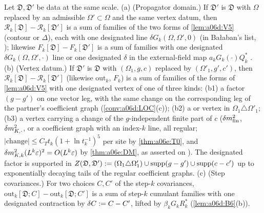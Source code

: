 \begin{lemma}\label{lem:a06d:V7}
Let $\mathfrak D,\mathfrak D'$ be data at the same scale. \textup{(a)} (Propagator domain.) If $\mathfrak D'$ is $\mathfrak D$ with $\Omega$ replaced by an admissible $\Omega'\subset\Omega$ and the same vertex datum, then $\mathcal R_k[\mathfrak D]-\mathcal R_k[\mathfrak D']$ is a sum of families of the two forms of \cref{lem:a06d:V5} (contour or $\Delta$), each with one designated line $\delta G_k(\Omega,\Omega',0)$ (in Ba{\l}aban's list, \cite[p.~414]{Ba3}); likewise $F_k[\mathfrak D]-F_k[\mathfrak D']$ is a sum of families with one designated $\delta G_k(\Omega,\Omega',\cdot)$ line or one designated $\delta$ in the external-field map $a_kG_k(\cdot)Q_k^*$ \cite[p.~415]{Ba3}. \textup{(b)} (Vertex datum.) If $\mathfrak D'$ is $\mathfrak D$ with $(\Omega_1,g,c)$ replaced by $(\Omega'_1,g',c')$, then $\mathcal R_k[\mathfrak D]-\mathcal R_k[\mathfrak D']$ (likewise $\mathrm{out}_k$, $F_k$) is a sum of families of the forms of \cref{lem:a06d:V5} with one designated vertex of one of three kinds: (b1) a factor $(g-g')$ on one vector leg, with the same change on the corresponding leg of the \cite[(1.7)]{Ba3} partner's coefficient graph (\cref{conv:a06d:LOC}(c)); (b2) a \cite[(1.6)]{Ba3} or \cite[(1.7)]{Ba3} vertex in $\Omega_1\triangle\Omega'_1$; (b3) a \cite[(1.7)]{Ba3} vertex carrying a change of the $g$-independent finite part of $c$ ($\delta m^2_{\mathrm{fin}}$, $\delta m^2_{K,\cdot}$, or a coefficient graph with an index-$k$ line, all regular; $|\text{change}|\le C_Tt_k(1+\ln t_k^{-1})^5$ per site by \cref{thm:a06e:T0}, and $\delta m^2_{K,k}(L^k\varepsilon)^2=O(L^k\varepsilon)$ by \cref{thm:a06e:DM}, as asserted on \cite[p.~418]{Ba3}). The designated factor is supported in $Z(\mathfrak D,\mathfrak D'):=(\Omega_1\triangle\Omega'_1)\cup\operatorname{supp}(g-g')\cup\operatorname{supp}(c-c')$ up to exponentially decaying tails of the regular coefficient graphs. \textup{(c)} (Step covariances.) For two choices $C,C'$ of the step-$k$ covariances, $\mathrm{out}_k[\mathfrak D;C]-\mathrm{out}_k[\mathfrak D;C']$ is a sum of step-$k$ cumulant families with one designated contraction by $\delta C:= C-C'$, lifted by $\beta_kG_kR_k^*$ (\cref{lem:a06d:B6}(b)).
\end{lemma}

